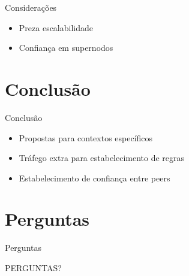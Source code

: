 \documentclass{beamer}
\begin{document}
  
  \begin{frame}{Considerações}
   \begin{itemize}
    \item Preza escalabilidade
    \item Confiança em supernodos
   \end{itemize}
   

  \end{frame}






\section{Conclusão}
  \begin{frame}{Conclusão}
    \begin{itemize}
     \item Propostas para contextos específicos
     \item Tráfego extra para estabelecimento de regras
     \item Estabelecimento de confiança entre peers
    \end{itemize}

  \end{frame}


\section{Perguntas}

\begin{frame}{Perguntas}
	\begin{center}		
		\Huge PERGUNTAS?
	\end{center}
	
\end{frame}
\end{document}
